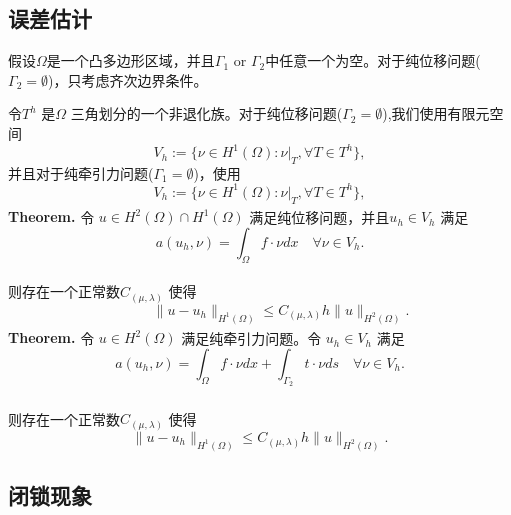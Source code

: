 \documentclass[a4paper,UTF8,titlepage]{ctexart}
\begin{document}
\subsection{误差估计}

假设$\Omega$是一个凸多边形区域，并且$\Gamma_1$ or $\Gamma_2$中任意一个为空。对于纯位移问题($\Gamma_2=\emptyset$)，只考虑齐次边界条件。
\par
令$T^h$ 是$\Omega$ 三角划分的一个非退化族。对于纯位移问题($\Gamma_2=\emptyset$),我们使用有限元空间
$$
V_h := \{ \nu \in H^1(\Omega) : \nu |_{T} , \forall T \in T^h \},
$$
并且对于纯牵引力问题($\Gamma_1 = \emptyset$)，使用
	$$
	V_h := \{ \nu \in H^1(\Omega) : \nu |_{T} , \forall T \in T^h \},
	$$
	\textbf{Theorem\textsuperscript{\cite{brenner2008mathematical}}.} 令 $u \in H^2(\Omega) \cap H^1(\Omega)$ 满足纯位移问题，并且$u_h \in V_h$ 满足
	$$
	a(u_h, \nu) = \int_{\Omega} f \cdot \nu dx \quad \forall \nu \in V_h.
	$$
	\\
	则存在一个正常数$C_{(\mu, \lambda)}$ 使得
	$$
	\quad \quad \quad
	\| u - u_h \|_{H^1(\Omega)} \le C_{(\mu, \lambda)} h \| u \|_{H^2(\Omega)}.
	$$
	\textbf{Theorem\textsuperscript{\cite{brenner2008mathematical}}.} 令 $u \in H^2(\Omega)$ 满足纯牵引力问题。令 $u_h \in V_h$ 满足
	$$
	a(u_h,\nu) = \int_{\Omega} f \cdot \nu dx + \int_{\Gamma_2} t \cdot \nu ds \quad \forall \nu \in V_h.
	$$ 
	\\
	则存在一个正常数$C_{(\mu, \lambda)}$ 使得\textsuperscript{\cite{brenner2008mathematical}}
	$$
	\| u - u_h \|_{H^1(\Omega)} \le C_{(\mu, \lambda)} h \| u \|_{H^2(\Omega)}.
	$$

\subsection{闭锁现象}
\end{document}
